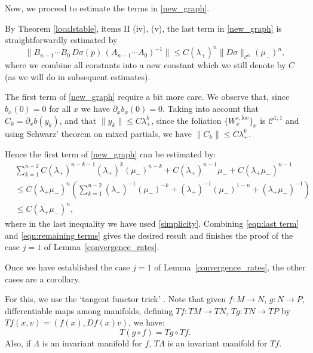 \documentclass[11pt]{amsart}
\theoremstyle{definition}
\theoremstyle{remark}
\numberwithin{equation}{section}
\newcommand{\C}{\mathcal{C}}
\begin{document}
Now, we proceed to estimate the terms in
\eqref{new_graph}.

By Theorem \ref{localstable},  items II (iv), (v), the last term in \eqref{new_graph}  is straightforwardly  estimated by
  \begin{equation}\label{eqn:last term}
   \|  B_{n-1} \cdots B_0 \, D \sigma(p) \, (A_{n-1} \cdots A_0)^{-1} \|
  \le C  (\lambda_+)^n \| D \sigma\|_{\C^0}   (\mu_-)^n ,
  \end{equation}
where we combine all constants into a new constant which we still denote by $C$ (as we will do in subsequent estimates).

The first term of \eqref{new_graph}
  require  a bit more care.
  We observe that, since $b_x(0) = 0 $ for all $x$
  we have $\partial_x b_x(0) = 0 $.
  Taking into account that $C_k = \partial_x b( y_k) $,
  and that $\|y_k\| \le C\lambda_+^k$,
  since the foliation $\{W^{s,\textrm{loc}}_x\}_x$ is $\C^{1,1}$ and using Schwarz' theorem on mixed partials, we have
  $\| C_k \| \le C\lambda_+^k $.

  Hence
  the  first term  of \eqref{new_graph} can
  be estimated by:
  \begin{equation}\label{eqn:remaining terms}
  \begin{split}
&  \sum_{k=1}^{n-2} C (\lambda_+ )^{n-k-1}  (\lambda_+)^k (\mu_-)^{n-k}
  +C(\lambda_+)^{n-1}\mu_- +C(\lambda_+\mu_-)^{n-1}\\
&  \le
  C (\lambda_+ \mu_-)^n \left(
  \sum_{k=1}^{n-2}  (\lambda_+)^{-1}(\mu_-)^{-k}+(\lambda_+)^{-1}(\mu_-)^{1-n}+(\lambda_+\mu_-)^{-1}\right)\\
&  \le C (\lambda_+ \mu_-)^n ,
  \end{split}
  \end{equation}
where in the last inequality we have used  \eqref{simplicity}.
  Combining \eqref{eqn:last term} and \eqref{eqn:remaining terms} gives the desired result and finishes the proof
  of the case $j=1$ of Lemma~\ref{convergence_rates}.



 Once we have established   the case $j=1$ of Lemma~\ref{convergence_rates},
  the other cases are a corollary.

  For this, we  use the `tangent functor trick' \cite{AbrahamR67,HirschP70}.
   Note that given  $f:M \rightarrow N$,  $g:N\rightarrow P$,
   differentiable maps among manifolds, defining
   $Tf: TM \rightarrow  TN$,
   $Tg: TN \rightarrow  TP $ by $Tf(x,v) = (f(x),Df(x)v)$,
   we have:
   \[
   T(g\circ f) = Tg \circ Tf .
   \]
   Also, if $\Lambda$ is an invariant
   manifold for $f$, $T\Lambda$ is an invariant manifold
   for $Tf$.
\end{document}
